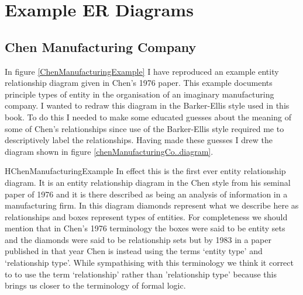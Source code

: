 \section{Example ER Diagrams }
\subsection{Chen Manufacturing Company}
\label{ChenManufacturingCompany}
In figure \ref{ChenManufacturingExample} I have reproduced an example entity relationship diagram  given in Chen's 1976 paper. This example documents principle types of entity in the organisation of an imaginary manufacturing company.  I wanted to redraw
this diagram in the Barker-Ellis style used in this book. To do this I needed to make some educated guesses about the meaning of some of Chen's relationships since use of the Barker-Ellis style  required me to descriptively label the relationships. Having made these guesses I drew the diagram shown
 in figure \ref{chenManufacturingCo..diagram}. 

\begin{erboxedFigure} {H}{ChenManufacturingExample}{
In effect this is the first ever entity relationship diagram. It is an entity relationship diagram in the Chen style from his seminal paper of 1976 and it is there described as being an analysis of information in a manufacturing firm. In this diagram
diamonds represent what we describe here as relationships and boxes represent types of entities.  
For completeness we should mention that in Chen's 1976 terminology the boxes were said to be entity sets and the diamonds were said to be relationship sets but by 1983 in a paper published in that year Chen is instead using the terms `entity type' and `relationship type'. While sympathising with this terminology we think it correct to to use the term `relationship' rather than 'relationship type' because this brings us closer to the terminology of formal logic.
}
\begin{center}
\scalebox{0.80}{}
\end{center}
\end{erboxedFigure}

